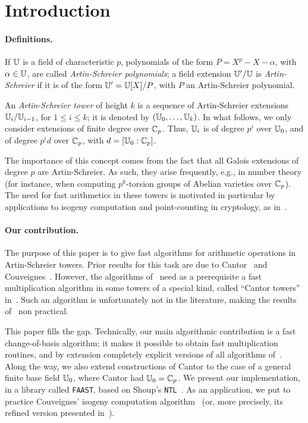 \section{Introduction}

\paragraph*{\bf Definitions.} If $\mathbb{U}$ is a field of characteristic $p$,
polynomials of the form $P=X^p - X - \alpha$, with $\alpha \in \mathbb{U}$,
are called {\em Artin-Schreier polynomials}; a field extension
$\mathbb{U}'/\mathbb{U}$ is {\em Artin-Schreier} if it is of the form $\mathbb{U}' = \mathbb{U}[X]/P$,
with $P$ an Artin-Schreier polynomial.

An {\em Artin-Schreier tower} of height $k$ is a sequence of
Artin-Schreier extensions $\mathbb{U}_i / \mathbb{U}_{i-1}$, for $1\le i \le k$; it is
denoted by $(\mathbb{U}_0, \ldots, \mathbb{U}_k)$. In what follows, we only consider
extensions of finite degree over $\mathbb{C}_p$. Thus, $\mathbb{U}_i$ is of degree
$p^i$ over $\mathbb{U}_0$, and of degree $p^id$ over $\mathbb{C}_p$, with
$d=[\mathbb{U}_0:\mathbb{C}_p]$.

The importance of this concept comes from the fact that all Galois
extensions of degree $p$ are Artin-Schreier. As such, they arise
frequently, e.g., in number theory (for instance, when computing
$p^k$-torsion groups of Abelian varieties over $\mathbb{C}_p$). The need for
fast arithmetics in these towers is motivated in particular by
applications to isogeny computation and point-counting in cryptology,
as in~\cite{Couveignes96}.

\paragraph*{\bf Our contribution.} The purpose of this paper is to
give fast algorithms for arithmetic operations in Artin-Schreier
towers. Prior results for this task are due to Cantor~\cite{Can89} and
Couveignes~\cite{Couveignes00}. However, the algorithms
of~\cite{Couveignes00} need as a prerequisite a fast multiplication
algorithm in some towers of a special kind, called ``Cantor towers''
in~\cite{Couveignes00}. Such an algorithm is unfortunately not in the
literature, making the results of~\cite{Couveignes00} non practical.

This paper fills the gap. Technically, our main algorithmic
contribution is a fast change-of-basis algorithm; it makes it possible
to obtain fast multiplication routines, and by extension completely
explicit versions of all algorithms of~\cite{Couveignes00}. Along the
way, we also extend constructions of Cantor to the case of a general
finite base field $\mathbb{U}_0$, where Cantor had $\mathbb{U}_0=\mathbb{C}_p$.  We present
our implementation, in a library called \texttt{FAAST}, based on
Shoup's \texttt{NTL}~\cite{NTL}. As an application, we put to practice
Couveignes' isogeny computation algorithm~\cite{Couveignes96} (or,
more precisely, its refined version presented in~\cite{DeFeo10}).

